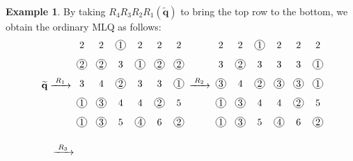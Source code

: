 \documentclass[reqno]{amsart}
\newcommand{\0}{\phantom{c}}
\newcommand{\qq}{\mathbf{q}}
\theoremstyle{plain}
\theoremstyle{definition}
\newtheorem{example}[thm]{Example}
\numberwithin{equation}{section}
\begin{document}
\begin{example}
By taking $R_4 R_3 R_2 R_1(\widetilde{\qq})$ to bring the top row to the bottom, we obtain the ordinary MLQ as follows:
\begin{align*}
\; \widetilde{\qq} & \xrightarrow[\hspace{15pt}]{R_1} \;
\begin{tikzpicture}[xscale=0.7,yscale=0.7,every node/.style={inner sep=0.8pt},baseline=55]
\node at (0, 5){2};\node at (1, 5){2};\node[circle, draw=black] at (2, 5){1};\node at (3, 5){2};\node at (4, 5){2};\node at (5, 5){2};\node[circle, draw=black] at (0, 4){2};\node[circle, draw=black] at (1, 4){2};\node at (2, 4){3};\node[circle, draw=black] at (3, 4){1};\node[circle, draw=black] at (4, 4){2};\node[circle, draw=black] at (5, 4){2};\node at (0, 3){3};\node at (1, 3){4};\node[circle, draw=black] at (2, 3){2};\node at (3, 3){3};\node at (4, 3){3};\node[circle, draw=black] at (5, 3){1};\node[circle, draw=black] at (0, 2){1};\node[circle, draw=black] at (1, 2){3};\node at (2, 2){4};\node at (3, 2){4};\node[circle, draw=black] at (4, 2){2};\node at (5, 2){5};\node[circle, draw=black] at (0, 1){1};\node[circle, draw=black] at (1, 1){3};\node at (2, 1){5};\node[circle, draw=black] at (3, 1){4};\node at (4, 1){6};\node[circle, draw=black] at (5, 1){2};
\end{tikzpicture}
\; \xrightarrow[\hspace{15pt}]{R_2} \;
\begin{tikzpicture}[xscale=0.7,yscale=0.7,every node/.style={inner sep=0.8pt},baseline=55]
\node at (0, 5){2};\node at (1, 5){2};\node[circle, draw=black] at (2, 5){1};\node at (3, 5){2};\node at (4, 5){2};\node at (5, 5){2};\node at (0, 4){3};\node[circle, draw=black] at (1, 4){2};\node at (2, 4){3};\node at (3, 4){3};\node at (4, 4){3};\node[circle, draw=black] at (5, 4){1};\node[circle, draw=black] at (0, 3){3};\node at (1, 3){4};\node[circle, draw=black] at (2, 3){2};\node[circle, draw=black] at (3, 3){3};\node[circle, draw=black] at (4, 3){3};\node[circle, draw=black] at (5, 3){1};\node[circle, draw=black] at (0, 2){1};\node[circle, draw=black] at (1, 2){3};\node at (2, 2){4};\node at (3, 2){4};\node[circle, draw=black] at (4, 2){2};\node at (5, 2){5};\node[circle, draw=black] at (0, 1){1};\node[circle, draw=black] at (1, 1){3};\node at (2, 1){5};\node[circle, draw=black] at (3, 1){4};\node at (4, 1){6};\node[circle, draw=black] at (5, 1){2};
\end{tikzpicture}
\\[1.3em] &
\; \xrightarrow[\hspace{15pt}]{R_3} \;

\end{align*}
\end{example}
\end{document}
